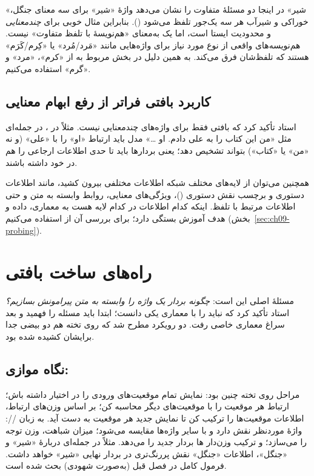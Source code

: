 \begin{correctionbox}{«شیر» در اینجا دو مسئلهٔ متفاوت را نشان می‌دهد}
واژهٔ «شیر» برای سه معنای جنگل، خوراکی و شیرآب هر سه یک‌جور تلفظ می‌شود (). بنابراین مثال خوبی برای \emph{چندمعنایی} و محدودیت  ایستا است، اما یک  به‌معنای «هم‌نویسهٔ با تلفظ متفاوت» نیست. هم‌نویسه‌های واقعی از نوع مورد نیاز برای  واژه‌هایی مانند «مَرد/مُرد» یا «کِرم/کَرَم» هستند که تلفظ‌شان فرق می‌کند. به همین دلیل در بخش مربوط به  از «کرم»، «مرد» و «گرم» استفاده می‌کنیم.
\end{correctionbox}

\subsection{کاربرد  بافتی فراتر از رفع ابهام معنایی}
استاد تأکید کرد که  بافتی فقط برای واژه‌های چندمعنایی نیست. مثلاً در ، در جمله‌ای مثل «من این کتاب را به علی دادم. او …» مدل باید ارتباط «او» را با «علی» (و نه «من» یا «کتاب») بتواند تشخیص دهد؛ یعنی بردارها باید تا حدی اطلاعات ارجاعی را هم در خود داشته باشند.

همچنین می‌توان از لایه‌های مختلف شبکه اطلاعات مختلفی بیرون کشید، مانند اطلاعات دستوری و برچسب نقش دستوری ()، ویژگی‌های معنایی، روابط وابسته به متن و حتی اطلاعات مرتبط با تلفظ. اینکه کدام اطلاعات در کدام لایه هست به معماری، داده و هدف آموزش بستگی دارد؛ برای بررسی آن از  استفاده می‌کنیم (بخش~\ref{sec:ch09-probing}).

\section{راه‌های ساخت  بافتی}

مسئلهٔ اصلی این است: \emph{چگونه بردار یک واژه را وابسته به متن پیرامونش بسازیم؟} استاد تأکید کرد که نباید  را با معماری  یکی دانست؛ ابتدا باید مسئله را فهمید و بعد سراغ معماری خاصی رفت. دو رویکرد مطرح شد که روی تخته هم دو بیضی جدا برایشان کشیده شده بود.

\subsection{نگاه موازی: }
مراحل روی تخته چنین بود: نمایش تمام موقعیت‌های ورودی را در اختیار داشته باش؛ ارتباط هر موقعیت را با موقعیت‌های دیگر محاسبه کن؛ بر اساس وزن‌های ارتباط، اطلاعات موقعیت‌ها را ترکیب کن تا نمایش جدید هر موقعیت به دست آید. به زبان //: واژهٔ موردنظر نقش  دارد و با  سایر واژه‌ها مقایسه می‌شود؛ میزان شباهت، وزن توجه را می‌سازد؛ و ترکیب وزن‌دار ها بردار جدید را می‌دهد. مثلاً در جمله‌ای دربارهٔ «شیر» و «جنگل»، اطلاعات «جنگل» نقش پررنگ‌تری در بردار نهایی «شیر» خواهد داشت. فرمول کامل در فصل قبل (به‌صورت شهودی) بحث شده است.

